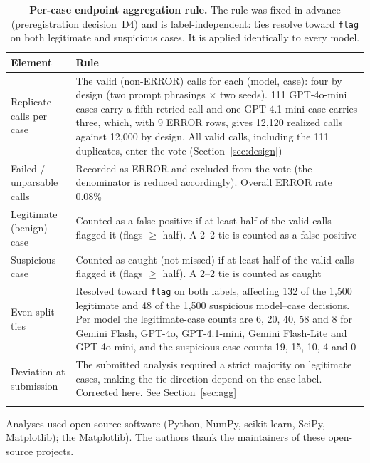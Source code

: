 \documentclass[pdflatex,sn-basic,Numbered]{sn-jnl}
\newcommand{\HLtext}[1]{\texthl{#1}}
\newcommand{\HLdel}[1]{\textcolor{HLink}{\sout{#1}}}
\newcommand{\HLtag}[1]{{\color{HLink}\bfseries [#1]~}}
\renewcommand{\HLtext}[1]{#1}\renewcommand{\HLdel}[1]{#1}%
\renewcommand{\HLtag}[1]{}}}
\begin{document}
\begin{table}[t]
\caption{\HLtag{Revised in revision}\textbf{Per-case endpoint aggregation rule.} The rule was fixed in advance (preregistration decision~D4) and is label-independent: ties resolve toward \texttt{flag} on both legitimate and suspicious cases. It is applied identically to every model.}\label{tab:vote}
\begin{tabular}{@{}p{}p{}@{}}
\toprule
Element & Rule \\
\midrule
Replicate calls per case & The valid (non-ERROR) calls for each (model, case): four by design (two prompt phrasings $\times$ two seeds). 111 GPT-4o-mini cases carry a fifth retried call and one GPT-4.1-mini case carries three, which, with 9 ERROR rows, gives 12{,}120 realized calls against 12{,}000 by design. All valid calls, including the 111 duplicates, enter the vote (Section~\ref{sec:design}) \\
Failed / unparsable calls & Recorded as ERROR and excluded from the vote (the denominator is reduced accordingly). Overall ERROR rate 0.08\% \\
Legitimate (benign) case & Counted as a false positive if at least half of the valid calls flagged it (flags $\geq$ half). A 2--2 tie is counted as a false positive \\
Suspicious case & Counted as caught (not missed) if at least half of the valid calls flagged it (flags $\geq$ half). A 2--2 tie is counted as caught \\
Even-split ties & Resolved toward \texttt{flag} on both labels, affecting 132 of the 1{,}500 legitimate and 48 of the 1{,}500 suspicious model--case decisions. Per model the legitimate-case counts are 6, 20, 40, 58 and 8 for Gemini Flash, GPT-4o, GPT-4.1-mini, Gemini Flash-Lite and GPT-4o-mini, and the suspicious-case counts 19, 15, 10, 4 and 0 \\
Deviation at submission & The submitted analysis required a strict majority on legitimate cases, making the tie direction depend on the case label. Corrected here. See Section~\ref{sec:agg} \\
\botrule
\end{tabular}
\end{table}

\clearpage
\backmatter

Analyses used open-source software (Python, NumPy, scikit-learn, SciPy, \HLdel{Matplotlib); the} \HLtext{Matplotlib). The} authors thank the maintainers of these open-source projects.
\end{document}
